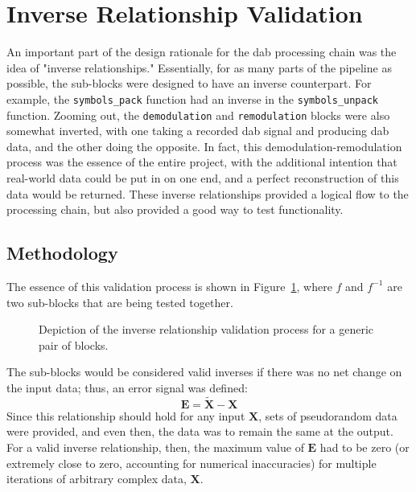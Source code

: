 \documentclass[class=report,11pt,crop=false]{standalone}
\begin{document}

\section{Inverse Relationship Validation}
An important part of the design rationale for the \gls{dab} processing chain was the idea of "inverse relationships." Essentially, for as many parts of the pipeline as possible, the sub-blocks were designed to have an inverse counterpart. For example, the \texttt{symbols\_pack} function had an inverse in the \texttt{symbols\_unpack} function. Zooming out, the \texttt{demodulation} and \texttt{remodulation} blocks were also somewhat inverted, with one taking a recorded \gls{dab} signal and producing \gls{dab} data, and the other doing the opposite. In fact, this demodulation-remodulation process was the essence of the entire project, with the additional intention that real-world data could be put in on one end, and a perfect reconstruction of this data would be returned. These inverse relationships provided a logical flow to the processing chain, but also provided a good way to test functionality.

\subsection{Methodology}
The essence of this validation process is shown in Figure~\ref{fig:inverse-overview}, where \(f\) and \(f^{-1}\) are two sub-blocks that are being tested together.

\begin{figure}[htbp]
  \centering
  \captionsetup{type=figure}
  \def\svgwidth{0.8\linewidth}
  { %
      }
  \caption{Depiction of the inverse relationship validation process for a generic pair of blocks.}
  \label{fig:inverse-overview}
\end{figure}

The sub-blocks would be considered valid inverses if there was no net change on the input data; thus, an error signal was defined:
\begin{equation}
  \mathbf{E} = \mathbf{\tilde{X}} - \mathbf{X}  
\end{equation}
Since this relationship should hold for any input \(\mathbf{X}\), sets of pseudorandom data were provided, and even then, the data was to remain the same at the output. For a valid inverse relationship, then, the maximum value of \(\mathbf{E}\) had to be zero (or extremely close to zero, accounting for numerical inaccuracies) for multiple iterations of arbitrary complex data, \(\mathbf{X}\).
\end{document}

